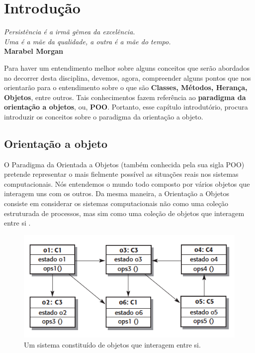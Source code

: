 \chapter{Introdução}\label{cap:cap1}

\begin{flushright}
  \textit{
    Persistência é a irmã gêmea da excelência. \\
    Uma é a mãe da qualidade, a outra é a mãe do tempo.
  } \\
  
  \textbf{Marabel Morgan}
\end{flushright}


Para haver um entendimento melhor sobre alguns conceitos que serão abordados no decorrer desta disciplina, devemos, agora, compreender alguns pontos que nos orientarão para o entendimento sobre o que são \textbf{Classes, Métodos, Herança, Objetos}, entre outros. Tais conhecimentos fazem referência ao \textbf{paradigma da orientação a objetos}, ou, \textbf{POO}. Portanto, esse capítulo introdutório, procura introduzir os conceitos sobre o paradigma da orientação a objeto.

\section{Orientação a objeto}

O Paradigma da Orientada a Objetos (também conhecida pela sua sigla POO) pretende representar o mais fielmente possível as
situações reais nos sistemas computacionais. Nós entendemos o mundo
todo composto por vários objetos que interagem uns com os outros. Da mesma maneira, a Orientação a Objetos consiste em considerar os sistemas computacionais não como uma coleção estruturada de processos, mas sim como uma coleção de objetos que interagem entre si \cite{farinelli2007conceitos}.

\begin{figure}[H]
	\centering
	\includegraphics[scale=0.6]{imagens/figura-01.png}
	\caption{Um sistema constituído de objetos que interagem entre si.}
	\label{fig:figura-01}
\end{figure}

